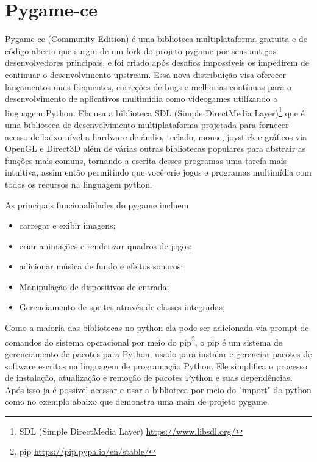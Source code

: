 \section{Pygame-ce}
Pygame-ce (Community Edition) é uma biblioteca multiplataforma gratuita e de código aberto que surgiu de um fork do projeto pygame por seus antigos desenvolvedores principais, e foi criado após desafios impossíveis os impedirem de continuar o desenvolvimento upstream. Essa nova distribuição visa oferecer lançamentos mais frequentes, correções de bugs e melhorias contínuas para o desenvolvimento de aplicativos multimídia como videogames utilizando a linguagem Python. Ela usa a biblioteca SDL (Simple DirectMedia Layer)\footnote{SDL (Simple DirectMedia Layer) \url{https://www.libsdl.org/}} que é uma biblioteca de desenvolvimento multiplataforma projetada para fornecer acesso de baixo nível a hardware de áudio, teclado, mouse, joystick e gráficos via OpenGL e Direct3D além de várias outras bibliotecas populares para abstrair as funções mais comuns, tornando a escrita desses programas uma tarefa mais intuitiva, assim então permitindo que você crie jogos e programas multimídia com todos os recursos na linguagem python.\cite{Pygame-ce}

As principais funcionalidades do pygame incluem
\begin{itemize}
    \item carregar e exibir imagens;
    \item criar animações e renderizar quadros de jogos;
    \item adicionar música de fundo e efeitos sonoros;
    \item Manipulação de dispositivos de entrada;
    \item Gerenciamento de sprites através de classes integradas;
\end{itemize}

Como a maioria das bibliotecas no python ela pode ser adicionada via prompt de comandos do sistema operacional  por meio do pip\footnote{pip \url{https://pip.pypa.io/en/stable/}}, o pip é um sistema de gerenciamento de pacotes para Python, usado para instalar e gerenciar pacotes de software escritos na linguagem de programação Python. Ele simplifica o processo de instalação, atualização e remoção de pacotes Python e suas dependências. 
Após isso ja é possível acessar e usar a biblioteca por meio do "import" do python como no exemplo abaixo que demonstra uma main de projeto pygame.


